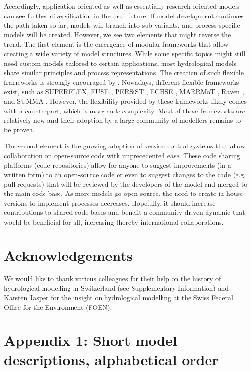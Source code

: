 \documentclass[10pt,a4paper]{article}
\begin{document}
Accordingly, application-oriented as well as essentially research-oriented models can see further diversification in the near future. If model development continues the path taken so far, models will branch into sub-variants, and process-specific models will be created. However, we see two elements that might reverse the trend. The first element is the emergence of modular frameworks that allow creating a wide variety of model structures. While some specific topics might still need custom models tailored to certain applications, most hydrological models share similar principles and process representations. The creation of such flexible frameworks is strongly encouraged by \citet{Clark2011a}. Nowadays, different flexible frameworks exist, such as SUPERFLEX, FUSE \citep{Clark2008}, PERSiST \citep{Futter2014}, ECHSE \citep{Kneis2015}, MARRMoT \citep{Knoben2019}, Raven \citep{Craig2020}, and SUMMA \citep{Clark2015}. {However, the flexibility provided by these frameworks likely comes with a counterpart, which is more code complexity. Most of these frameworks are relatively new and their adoption by a large community of modellers remains to be proven}.

The second element is the growing adoption of version control systems that allow collaboration on open-source code with unprecedented ease. These code sharing platforms (code repositories) allow for anyone to suggest improvements (in a written form) to an open-source code or even to suggest changes to the code (e.g. pull requests) that will be reviewed by the developers of the model and merged to the main code base. As more models go open source, the need to create in-house versions to implement processes decreases. Hopefully, it should increase contributions to shared code bases and benefit a community-driven dynamic that would be beneficial for all, increasing thereby international collaborations.


\section*{Acknowledgements}

We would like to thank various colleagues for their help on the history of hydrological modelling in Switzerland (see Supplementary Information) and Karsten Jasper for the insight on hydrological modelling at the Swiss Federal Office for the Environment (FOEN).


\section*{Appendix 1: Short model descriptions, alphabetical order}
\label{appendix:1}
\end{document}
